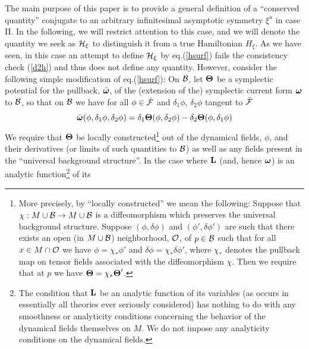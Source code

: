 The main purpose of this paper is to provide a general definition of a
``conserved quantity'' conjugate to an arbitrary infinitesimal
asymptotic symmetry $\xi^a$ in case II. In the following, we will
restrict attention to this case, and we will denote the quantity we
seek as ${\cal H}_\xi$ to distinguish it from a true Hamiltonian
$H_\xi$. As we have seen, in this case an attempt to define ${\cal
H}_\xi$ by eq.(\ref{hsurf}) fails the consistency check (\ref{d2h})
and thus does not define any quantity. However, consider the following
simple modification of eq.(\ref{hsurf}): On ${\cal B}$, let
${\mbox{\boldmath $\Theta$}}$ be a symplectic potential for the
pullback, $\bar{\mbox{\boldmath $\omega$}}$, of the (extension of the)
symplectic current form ${\mbox{\boldmath $\omega$}}$ to ${\cal B}$,
so that on ${\cal B}$ we have for all $\phi \in \bar{\cal F}$ and
$\delta_1 \phi$, $\delta_2 \phi$ tangent to $\bar{\cal F}$
\begin{equation}
\bar{\mbox{\boldmath $\omega$}}(\phi, \delta_1 \phi, \delta_2 \phi) =
\delta_1 {\mbox{\boldmath $\Theta$}}(\phi, \delta_2 \phi) -
\delta_2 {\mbox{\boldmath $\Theta$}}(\phi, \delta_1 \phi)
\label{Theta}
\end{equation}
We require that ${\mbox{\boldmath $\Theta$}}$ be locally
constructed\footnote{More precisely, by ``locally constructed'' we
mean the following: Suppose that $\chi : M \cup {\cal B} \rightarrow M
\cup {\cal B}$ is a diffeomorphism which preserves the universal
background structure. Suppose $(\phi, \delta \phi)$ and $(\phi',
\delta \phi')$ are such that there exists an open (in $M \cup {\cal
B}$) neighborhood, $\cal O$, of $p \in {\cal B}$ such that for all $x
\in M \cap \cal O$ we have $\phi = \chi_* \phi'$ and $\delta \phi =
\chi_* \delta \phi'$, where $\chi_*$ denotes the pullback map on
tensor fields associated with the diffeomorphism $\chi$. Then we
require that at $p$ we have ${\mbox{\boldmath $\Theta$}} = \chi_*
{\mbox{\boldmath $\Theta$}}'$.\label{loc}} out of the dynamical
fields, $\phi$, and their derivatives (or limits of such quantities to
${\cal B}$) as well as any fields present in the ``universal
background structure''. In the case where $\bf L$ (and, hence
${\mbox{\boldmath $\omega$}}$) is an analytic function\footnote{The
condition that $\bf L$ be an analytic function of its variables (as
occurs in essentially all theories ever seriously considered) has
nothing to do with any smoothness or analyticity conditions concerning
the behavior of the dynamical fields themselves on $M$. We do not
impose any analyticity conditions on the dynamical fields.} of its
